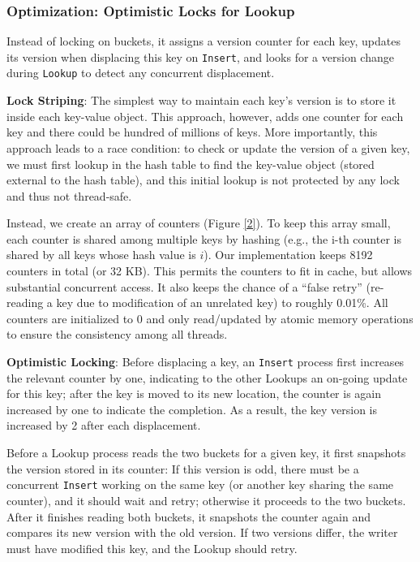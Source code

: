 \documentclass[11pt]{article}
\begin{document}
\subsubsection{Optimization: Optimistic Locks for Lookup}
\label{sec:org5e932a9}
Instead of locking on buckets, it assigns a version counter for each key, updates its version when
displacing this key on \texttt{Insert}, and looks for a version change during \texttt{Lookup} to detect any concurrent
displacement.

\textbf{Lock Striping}: The simplest way to maintain each key’s version is to store it inside each key-value
object. This approach, however, adds one counter for each key and there could be hundred of millions
of keys. More importantly, this approach leads to a race condition: to check or update the version of
a given key, we must first lookup in the hash table to find the key-value object (stored external to
the hash table), and this initial lookup is not protected by any lock and thus not thread-safe.

Instead, we create an array of counters (Figure \ref{2}). To keep this array small, each counter is
shared among multiple keys by hashing (e.g., the i-th counter is shared by all keys whose hash value
is \(i\)). Our implementation keeps 8192 counters in total (or 32 KB). This permits the counters to
fit in cache, but allows substantial concurrent access. It also keeps the chance of a “false retry”
(re-reading a key due to modification of an unrelated key) to roughly 0.01\%. All counters are
initialized to 0 and only read/updated by atomic memory operations to ensure the consistency among all
threads.

\textbf{Optimistic Locking}: Before displacing a key, an \texttt{Insert} process first increases the relevant counter by
one, indicating to the other Lookups an on-going update for this key; after the key is moved to its
new location, the counter is again increased by one to indicate the completion. As a result, the key
version is increased by 2 after each displacement.

Before a Lookup process reads the two buckets for a given key, it first snapshots the version stored
in its counter: If this version is odd, there must be a concurrent \texttt{Insert} working on the same key (or
another key sharing the same counter), and it should wait and retry; otherwise it proceeds to the two
buckets. After it finishes reading both buckets, it snapshots the counter again and compares its new
version with the old version. If two versions differ, the writer must have modified this key, and the
Lookup should retry.
\end{document}
